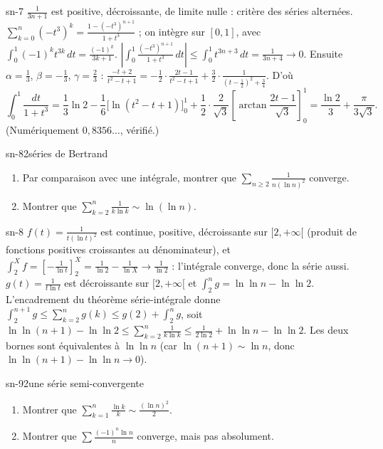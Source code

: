 \begin{corrige}{sn-7}
 $\frac1{3n+1}$ est positive, décroissante, de limite nulle : critère des séries alternées.
 $\sum_{k=0}^n(-t^3)^k=\frac{1-(-t^3)^{n+1}}{1+t^3}$ ; on intègre sur $[0,1]$, avec $\int_0^1(-1)^kt^{3k}\,dt=\frac{(-1)^k}{3k+1}$.
 $\left|\int_0^1\frac{(-t^3)^{n+1}}{1+t^3}\,dt\right|\leq\int_0^1t^{3n+3}\,dt=\frac1{3n+4}\to0$. Ensuite $\alpha=\frac13$, $\beta=-\frac13$,
$\gamma=\frac23$ : $\frac{-t+2}{t^2-t+1}=-\frac12\cdot\frac{2t-1}{t^2-t+1}+\frac32\cdot\frac1{(t-\frac12)^2+\frac34}$. D'où
\[\int_0^1\frac{dt}{1+t^3}=\frac13\ln2-\frac16\big[\ln(t^2-t+1)\big]_0^1+\frac12\cdot\frac2{\sqrt3}\left[\arctan\frac{2t-1}{\sqrt3}\right]_0^1=\frac{\ln2}3+\frac\pi{3\sqrt3}.\]
(Numériquement $0{,}8356\dots$, vérifié.)
\end{corrige}

\begin{exo}{sn-8}{2}{séries de Bertrand}
\begin{enumerate}
\item Par comparaison avec une intégrale, montrer que $\sum_{n\geq2}\frac1{n(\ln n)^2}$ converge.
\item Montrer que $\sum_{k=2}^n\frac1{k\ln k}\sim\ln(\ln n)$.
\end{enumerate}
\end{exo}

\begin{corrige}{sn-8}
 $f(t)=\frac1{t(\ln t)^2}$ est continue, positive, décroissante sur $[2,+\infty[$ (produit de fonctions positives croissantes au
dénominateur), et $\int_2^X f=\left[-\frac1{\ln t}\right]_2^X=\frac1{\ln2}-\frac1{\ln X}\to\frac1{\ln2}$ : l'intégrale converge, donc la série aussi.
 $g(t)=\frac1{t\ln t}$ est décroissante sur $[2,+\infty[$ et $\int_2^ng=\ln\ln n-\ln\ln2$. L'encadrement du théorème série-intégrale
donne $\int_2^{n+1}g\leq\sum_{k=2}^ng(k)\leq g(2)+\int_2^ng$, soit $\ln\ln(n+1)-\ln\ln2\leq\sum_{k=2}^n\frac1{k\ln k}\leq\frac1{2\ln2}+\ln\ln n-\ln\ln2$.
Les deux bornes sont équivalentes à $\ln\ln n$ (car $\ln(n+1)\sim\ln n$, donc $\ln\ln(n+1)-\ln\ln n\to0$).
\end{corrige}

\begin{exo}{sn-9}{2}{une série semi-convergente}
\begin{enumerate}
\item Montrer que $\sum_{k=1}^n\frac{\ln k}k\sim\frac{(\ln n)^2}2$.
\item Montrer que $\sum\frac{(-1)^n\ln n}n$ converge, mais pas absolument.
\end{enumerate}
\end{exo}

